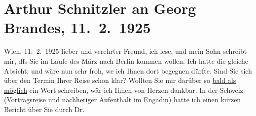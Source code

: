 

         
         \renewcommand{\erwaehntePersonen}{Personen: Georg Brandes, Heinrich Schnitzler, Hans Zbinden}
         \renewcommand{\erwaehnteOrte}{Orte: Berlin, Engadin, Kopenhagen, Schweiz, Wien}
         \renewcommand{\erwaehnteWerke}{Werke: Hauptströmungen der Literatur des neunzehnten Jahrhunderts}
               \section[Arthur Schnitzler an Georg Brandes, 11. 2. 1925]{ Arthur Schnitzler an Georg Brandes, 11. 2. 1925}\nopagebreak{}\rehead{ }\begin{ledgroupsized}[t]{13cm}\normalsize\beginnumbering{} \toendnotes[C]{\smallbreak\pagebreak[2]} 
\toendnotes[C]{\smallbreak}\pstart
           \raggedleft{}{\pb}Wien, 11. 2. 1925\pend
           \pstart{}lieber und verehrter Freund,\pend\pstart
           ich lese, und mein Sohn
               schreibt mir, dſs Sie im Laufe des März nach Berlin kommen wollen. Ich hatte die gleiche Absicht; und wäre
               nun sehr froh, we{\geminationn} ich Ihnen dort begegnen dürfte. Sind
               Sie sich über den Termin Ihrer Reise schon klar? Wollten Sie mir darüber so \uline{bald als möglich} ein Wort schreiben, wär ich Ihnen von
               Herzen dankbar.\pend
           \pstart
           In der Schweiz (Vortragsreise und nachheriger
               Aufenthalt im Engadin) {\pb}hatte ich einen kurzen Bericht über Sie durch Dr.

\end{ledgroupsized}
